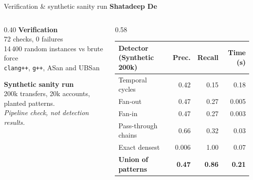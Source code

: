 \documentclass[aspectratio=169,11pt]{beamer}
\newcommand{\memberbadge}[1]{%
  \hfill{\small\bfseries\color{memberred}#1}%
}
\begin{document}
\begin{frame}{Verification \& synthetic sanity run \memberbadge{Shatadeep De}}
\begin{columns}[T,onlytextwidth]
\begin{column}{0.40\textwidth}
\textbf{Verification}\\
72 checks, 0 failures\\
14\,400 random instances vs brute force\\
\texttt{clang++}, \texttt{g++}, ASan and UBSan

\vspace{0.5cm}
\textbf{Synthetic sanity run}\\
200k transfers, 20k accounts, planted patterns.\\
\emph{Pipeline check, not detection results.}
\end{column}
\begin{column}{0.58\textwidth}
\centering
\footnotesize
\setlength{\tabcolsep}{4.5pt}
\begin{tabular}{@{}lrrr@{}}
\toprule
\textbf{Detector (Synthetic 200k)} & \textbf{Prec.} & \textbf{Recall} & \textbf{Time (s)} \\
\midrule
Temporal cycles & 0.42 & 0.15 & 0.18 \\
Fan-out & 0.47 & 0.27 & 0.005 \\
Fan-in & 0.47 & 0.27 & 0.003 \\
Pass-through chains & 0.66 & 0.32 & 0.03 \\
Exact densest & 0.006 & 1.00 & 0.07 \\
\midrule
\textbf{Union of patterns} & \textbf{0.47} & \textbf{0.86} & \textbf{0.21} \\
\bottomrule
\end{tabular}
\end{column}
\end{columns}
\end{frame}
\end{document}
